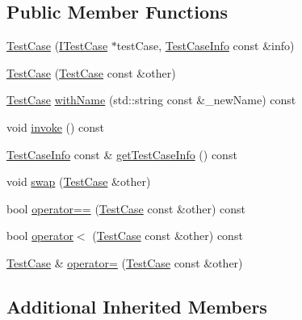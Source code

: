 \subsection*{Public Member Functions}
\begin{DoxyCompactItemize}
\item 
\mbox{\hyperlink{class_catch_1_1_test_case_a03a5b913484681bd6d398dc5e9c2a907}{Test\+Case}} (\mbox{\hyperlink{struct_catch_1_1_i_test_case}{I\+Test\+Case}} $\ast$test\+Case, \mbox{\hyperlink{struct_catch_1_1_test_case_info}{Test\+Case\+Info}} const \&info)
\item 
\mbox{\hyperlink{class_catch_1_1_test_case_ac0011d3789edc3e44edb41f13c4775a0}{Test\+Case}} (\mbox{\hyperlink{class_catch_1_1_test_case}{Test\+Case}} const \&other)
\item 
\mbox{\hyperlink{class_catch_1_1_test_case}{Test\+Case}} \mbox{\hyperlink{class_catch_1_1_test_case_a0812e8a216d09b087d5874687009f0d6}{with\+Name}} (std\+::string const \&\+\_\+new\+Name) const
\item 
void \mbox{\hyperlink{class_catch_1_1_test_case_a26f346c8446dded0562fe3818ae71651}{invoke}} () const
\item 
\mbox{\hyperlink{struct_catch_1_1_test_case_info}{Test\+Case\+Info}} const  \& \mbox{\hyperlink{class_catch_1_1_test_case_a1ea0d79f49156cebea076fe1ba50d2b6}{get\+Test\+Case\+Info}} () const
\item 
void \mbox{\hyperlink{class_catch_1_1_test_case_aee38f908faf10b905b209ca388275413}{swap}} (\mbox{\hyperlink{class_catch_1_1_test_case}{Test\+Case}} \&other)
\item 
bool \mbox{\hyperlink{class_catch_1_1_test_case_a5456d03a90f75292835c158f3a3374a1}{operator==}} (\mbox{\hyperlink{class_catch_1_1_test_case}{Test\+Case}} const \&other) const
\item 
bool \mbox{\hyperlink{class_catch_1_1_test_case_a030e4b9282e9b32e08c8bd5e5cd6fa98}{operator$<$}} (\mbox{\hyperlink{class_catch_1_1_test_case}{Test\+Case}} const \&other) const
\item 
\mbox{\hyperlink{class_catch_1_1_test_case}{Test\+Case}} \& \mbox{\hyperlink{class_catch_1_1_test_case_a8022e3f74232f7887d2d2cbbc8876502}{operator=}} (\mbox{\hyperlink{class_catch_1_1_test_case}{Test\+Case}} const \&other)
\end{DoxyCompactItemize}
\subsection*{Additional Inherited Members}


